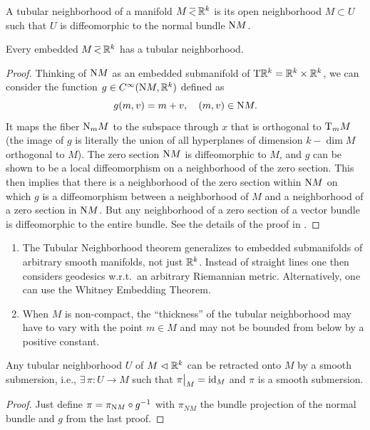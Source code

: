\begin{defn}
    A tubular neighborhood of a manifold $M\emb \bbR^k$ is its open neighborhood $M\subset U$ such that $U$ is diffeomorphic to the normal bundle $\mathrm{N} M$.
\end{defn}

\begin{thm}\label{thm tubular neighb}
    Every embedded $M\emb \bbR^k$ has a tubular neighborhood.
\end{thm}
\begin{proof}
    Thinking of $\mathrm{N} M$ as an embedded submanifold of $\mathrm{T}\mathbb{R}^k=\mathbb{R}^k\times\mathbb{R}^k$, we can consider the function $g\in C^\infty(\mathrm{N} M,\mathbb{R}^k)$ defined as
    \[
        g(m,v)=m+v,\quad (m,v)\in \mathrm{N} M.
    \]
    It maps the fiber $\mathrm{N}_m M$ to the subspace through $x$ that is orthogonal to $\mathrm{T}_m M$ (the image of $g$ is literally the union of all hyperplanes of dimension $k-\dim M$ orthogonal to $M$).
    The zero section $\mathrm{N} M$ is diffeomorphic to $M$, and $g$ can be shown to be a local diffeomorphism on a neighborhood of the zero section. This then implies that there is a neighborhood of the zero section within $\mathrm{N} M$ on which $g$ is a diffeomorphism between a neighborhood of $M$ and a neighborhood of a zero section in $\mathrm{N} M$. But any neighborhood of a zero section of a vector bundle is diffeomorphic to the entire bundle. See the details of the proof in \cite[Thm.~6.24]{Lee}.
\end{proof}

\begin{rem}
\begin{enumerate}
    \item The Tubular Neighborhood theorem generalizes to embedded submanifolds of arbitrary smooth manifolds, not just $\mathbb{R}^k$. Instead of straight lines one then considers geodesics w.r.t.\ an arbitrary Riemannian metric. Alternatively, one can use the Whitney Embedding Theorem. 
    \item When $M$ is non-compact, the ``thickness'' of the tubular neighborhood may have to vary with the point $m\in M$ and may not be bounded from below by a positive constant.
\end{enumerate}
\end{rem}

\begin{thm}
    Any tubular neighborhood $U$ of $M\vartriangleleft\mathbb{R}^k$ can be retracted onto $M$ by a smooth submersion, i.e., $\exists\, \pi:U\to M$ such that $\restr{\pi}{M}=\id_M$ and $\pi$ is a smooth submersion.
\end{thm}
\begin{proof}
    Just define $\pi= \pi_{\mathrm{N} M}\circ g^{-1}$ with $\pi_{NM}$ the bundle projection of the normal bundle and $g$ from the last proof.
\end{proof}

